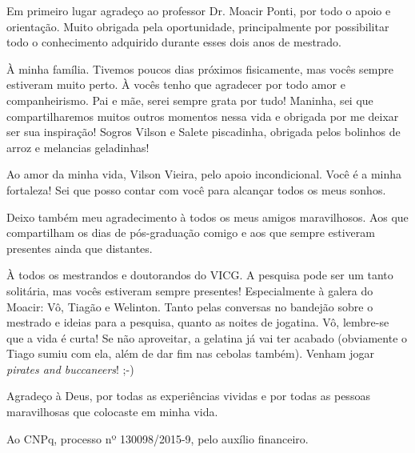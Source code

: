 
Em primeiro lugar agradeço ao professor Dr. Moacir Ponti, por todo o apoio e orientação. Muito obrigada pela oportunidade, principalmente por possibilitar todo o conhecimento adquirido durante esses dois anos de mestrado.

À minha família. Tivemos poucos dias próximos fisicamente, mas vocês sempre estiveram muito perto. À vocês tenho que agradecer por todo amor e companheirismo. Pai e mãe, serei sempre grata por tudo! Maninha, sei que compartilharemos muitos outros momentos nessa vida e obrigada por me deixar ser sua inspiração! Sogros Vilson e Salete piscadinha, obrigada pelos bolinhos de arroz e melancias geladinhas!

Ao amor da minha vida, Vilson Vieira, pelo apoio incondicional. Você é a minha fortaleza! Sei que posso contar com você para alcançar todos os meus sonhos.

Deixo também meu agradecimento à todos os meus amigos maravilhosos. Aos que compartilham os dias de pós-graduação comigo e aos que sempre estiveram presentes ainda que distantes.

À todos os mestrandos e doutorandos do VICG. A pesquisa pode ser um tanto solitária, mas vocês estiveram sempre presentes! Especialmente à galera do Moacir: Vô, Tiagão e Welinton. Tanto pelas conversas no bandejão sobre o mestrado e ideias para a pesquisa, quanto as noites de jogatina. Vô, lembre-se que a vida é curta! Se não aproveitar, a gelatina já vai ter acabado (obviamente o Tiago sumiu com ela, além de dar fim nas cebolas também). Venham jogar \textit{pirates and buccaneers}! ;-)

Agradeço à Deus, por todas as experiências vividas e por todas as pessoas maravilhosas que colocaste em minha vida.

Ao CNPq, processo nº 130098/2015-9, pelo auxílio financeiro.
